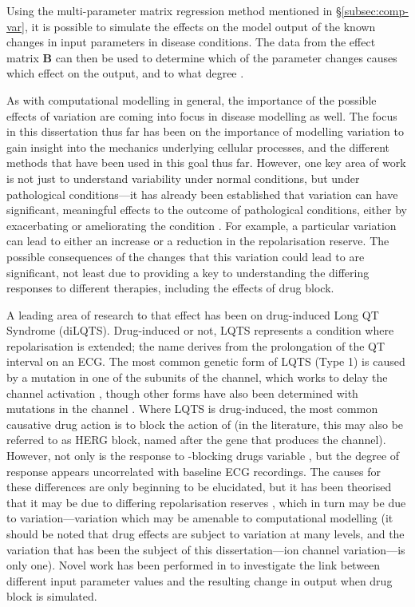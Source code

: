 \documentclass[../thesis-main.tex]{subfiles}
\begin{document}
 Using the multi-parameter matrix regression method mentioned in \S\ref{subsec:comp-var}, it is possible to simulate the effects on the model output of the known changes in input parameters in disease conditions. The data from the effect matrix $\mathbf{B}$ can then be used to determine which of the parameter changes causes which effect on the output, and to what degree \citep{Sarkar2012}.
 
 As with computational modelling in general, the importance of the possible effects of variation are coming into focus in disease modelling as well. The focus in this dissertation thus far has been on the importance of modelling variation to gain insight into the mechanics underlying cellular processes, and the different methods that have been used in this goal thus far. However, one key area of work is not just to understand variability under normal conditions, but under pathological conditions---it has already been established that variation can have significant, meaningful effects to the outcome of pathological conditions, either by exacerbating or ameliorating the condition \citep{Sarkar2012, John2012}. For example, a particular variation can lead to either an increase or a reduction in the repolarisation reserve. The possible consequences of the changes that this variation could lead to are significant, not least due to providing a key to understanding the differing responses to different therapies, including the effects of drug block.
 
 A leading area of research to that effect has been on drug-induced Long QT Syndrome (diLQTS). Drug-induced or not, LQTS represents a condition where repolarisation is extended; the name derives from the prolongation of the QT interval on an ECG. The most common genetic form of LQTS (Type 1) is caused by a mutation in one of the subunits of the \iks{} channel, which works to delay the channel activation \citep{Jons2011, Hoefen2012, Jou2013}, though other forms have also been determined with mutations in the \ina{} channel \citep{Hashambhoy2011}. Where LQTS is drug-induced, the most common causative drug action is to block the action of \ikr{} (in the literature, this may also be referred to as HERG block, named after the gene that produces the channel). However, not only is the response to \ikr{}-blocking drugs variable \citep{Kannankeril2010}, but the degree of response appears uncorrelated with baseline ECG recordings. The causes for these differences are only beginning to be elucidated, but it has been theorised that it may be due to differing repolarisation reserves \citep{Varro2011}, which in turn may be due to variation---variation which may be amenable to computational modelling (it should be noted that drug effects are subject to variation at many levels, and the variation that has been the subject of this dissertation---ion channel variation---is only one). Novel work has been performed in \citet{Sarkar2011} to investigate the link between different input parameter values and the resulting change in output when drug block is simulated.
 
\end{document}

